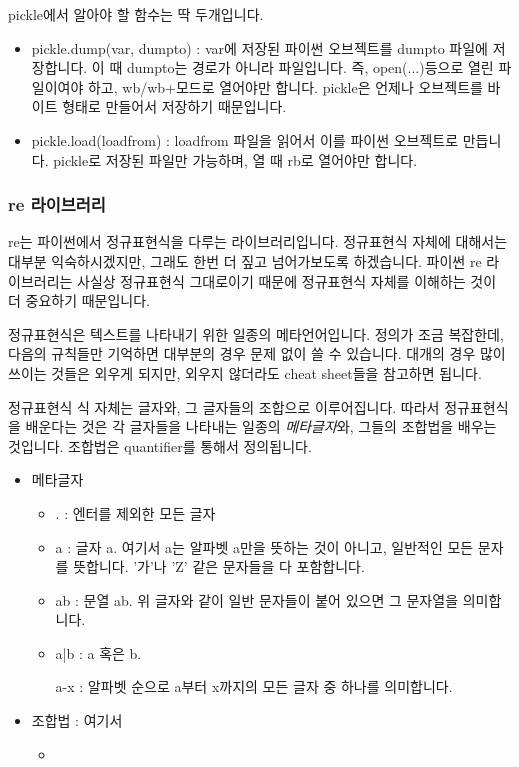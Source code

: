 \documentclass[twoside]{article}
\begin{document}
pickle에서 알아야 할 함수는 딱 두개입니다.

\begin{itemize} 
\item pickle.dump(var, dumpto) : var에 저장된 파이썬 오브젝트를 dumpto 파일에 저장합니다. 이 때 dumpto는 경로가 아니라 파일입니다. 즉, open(...)등으로 열린 파일이여야 하고, wb/wb+모드로 열어야만 합니다. pickle은 언제나 오브젝트를 바이트 형태로 만들어서 저장하기 때문입니다. 
\item pickle.load(loadfrom) : loadfrom 파일을 읽어서 이를 파이썬 오브젝트로 만듭니다. pickle로 저장된 파일만 가능하며, 열 때 rb로 열어야만 합니다. 
\end{itemize}



\subsubsection{re 라이브러리} 

re는 파이썬에서 정규표현식을 다루는 라이브러리입니다. 정규표현식 자체에 대해서는 대부분 익숙하시겠지만, 그래도 한번 더 짚고 넘어가보도록 하겠습니다. 파이썬 re 라이브러리는 사실상 정규표현식 그대로이기 때문에 정규표현식 자체를 이해하는 것이 더 중요하기 때문입니다. 

정규표현식은 텍스트를 나타내기 위한 일종의 메타언어입니다. 정의가 조금 복잡한데, 다음의 규칙들만 기억하면 대부분의 경우 문제 없이 쓸 수 있습니다. 대개의 경우 많이 쓰이는 것들은 외우게 되지만, 외우지 않더라도 cheat sheet들을 참고하면 됩니다. 

정규표현식 식 자체는 글자와, 그 글자들의 조합으로 이루어집니다. 따라서 정규표현식을 배운다는 것은 각 글자들을 나타내는 일종의 \textit{메타글자}와, 그들의 조합법을 배우는 것입니다. 조합법은 quantifier를 통해서 정의됩니다. 

\begin{itemize} 
\item 메타글자 
\begin{itemize} 
\item . : 엔터를 제외한 모든 글자
\item a : 글자 a. 여기서 a는 알파벳 a만을 뜻하는 것이 아니고, 일반적인 모든 문자를 뜻합니다. '가'나 'Z' 같은 문자들을 다 포함합니다. 
\item ab : 문열 ab. 위 글자와 같이 일반 문자들이 붙어 있으면 그 문자열을 의미합니다. 
\item a|b : a 혹은 b. 
\item [a-x] : 알파벳 순으로 a부터 x까지의 모든 글자 중 하나를 의미합니다. 
\end{itemize}
\item 조합법 : 여기서 
\begin{itemize} 
\item 
\end{itemize}
\end{itemize}
\end{document}
